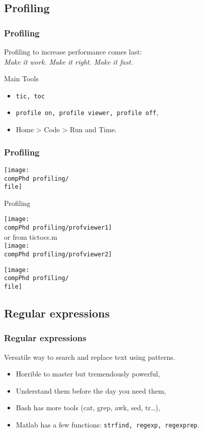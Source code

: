\documentclass[]{beamer} %
\def\pathbase{/Users/pmxal9/} 	%
\def\pathbase{/Users/pmaal/} 	%
\edef\drop{\pathbase Dropbox/}		%
\edef\compPhd{\drop Nottingham/repos/phd/Seminars/+MatlabComputationalPhD/}
\begin{document}
\subsection{Profiling}
\begin{frame}[fragile]
\frametitle{Profiling}\centering
Profiling to increase performance comes last:\\
\textit{Make it work. Make it right. Make it fast.}\\[8mm]
\pause
\begin{block}{Main Tools}
\begin{itemize}
\item \verb+tic, toc+
\item \verb+profile on, profile viewer, profile off+,
\item Home > Code > Run and Time.
\end{itemize}
\end{block}
\end{frame}


\begin{frame}[fragile]
\frametitle{Profiling}\centering
\def\file{tictoc}
\texttt{[image: \\compPhd profiling/\\file]}
\end{frame}


\begin{frame}{Profiling}\centering
\def\file{profileviewer}
\begin{minipage}{4cm}
\texttt{[image: \\compPhd profiling/profviewer1]}\\
or from tictocs.m\\[4mm]
\texttt{[image: \\compPhd profiling/profviewer2]}
\end{minipage}%
\pause\begin{minipage}{6cm}
\texttt{[image: \\compPhd profiling/\\file]}
\end{minipage}
\end{frame}


\subsection{Regular expressions}
\begin{frame}[fragile]
\frametitle{Regular expressions}
Versatile way to search and replace text using patterns.
\begin{itemize}
\item Horrible to master but tremendously powerful,
\item Understand them before the day you need them,
\item Bash has more tools (cat, grep, awk, sed, tr\dots),
\item Matlab has a few functions: \verb+strfind, regexp, regexprep+.
\end{itemize}
\end{frame}
\end{document}
